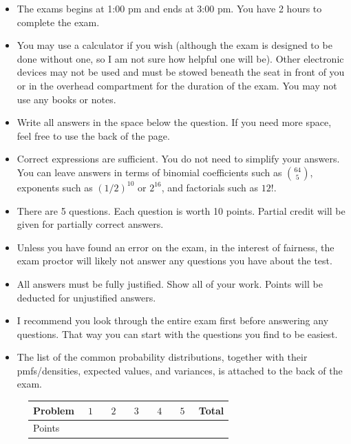 \documentclass[12pt]{article}
\begin{document}
\begin{itemize}
\item The exams begins at 1:00 pm and ends at 3:00 pm. You have 2 hours to complete the exam.
\item You may use a calculator if you wish (although the exam is designed to be done without one, so I am not sure how helpful one will be). Other electronic devices may not be used and must be stowed beneath the seat in front of you or in the overhead compartment for the duration of the exam. You may not use any books or notes. 
\item Write all answers in the space below the question. If you need more space, feel free to use the back of the page.
\item Correct expressions are sufficient. You do not need to simplify your answers. You can leave answers in terms of binomial coefficients such as $\binom{64}{5}$, exponents such as $(1/2)^{10}$ or $2^{16}$, and factorials such as $12!$.
\item There are 5 questions. Each question is worth 10 points. Partial credit will be given for partially correct answers.
\item Unless you have found an error on the exam, in the interest of fairness, the exam proctor will likely not answer any questions you have about the test.
\item All answers must be fully justified. Show all of your work. Points will be deducted for unjustified answers.
\item I recommend you look through the entire exam first before answering any questions. That way you can start with the questions you find to be easiest.
\item The list of the common probability distributions, together with their pmfs/densities, expected values, and variances, is attached to the back of the exam.
\end{itemize}

\begin{figure}[H]
\centering
\label{my-label}
\begin{tabular}{|l|l|l|l|l|l|l|}
\hline
Problem & $\:\:1\:\:$ & $\:\:2\:\:$ & $\:\:3\:\:$ & $\:\:4\:\:$ & $\:\:5\:\:$ & Total \\ \hline
Points  &   &   &   &   &   &       \\ \hline
\end{tabular}
\end{figure}

\pagebreak
\end{document}
